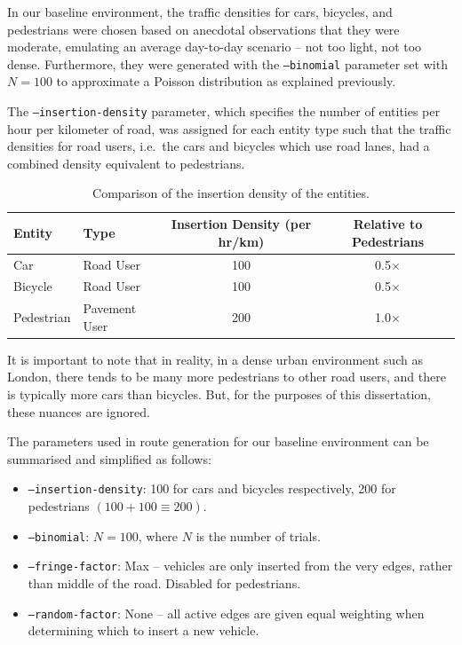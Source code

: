 \documentclass[a4paper]{report}
\begin{document}
In our baseline environment, the traffic densities for cars, bicycles, and pedestrians were chosen based on anecdotal observations\footnotemark{} that they were moderate, emulating an average day-to-day scenario -- not too light, not too dense. Furthermore, they were generated with the \texttt{--binomial} parameter set with $N=100$ to approximate a Poisson distribution as explained previously.

The \texttt{--insertion-density} parameter, which specifies the number of entities per hour per kilometer of road, was assigned for each entity type such that the traffic densities for road users, i.e.\ the cars and bicycles which use road lanes, had a combined density equivalent to pedestrians.

\begin{table}[H]
  \centering
  \begin{tabular}{l l c c}
    \hline
    \textbf{Entity} & \textbf{Type} & \textbf{Insertion Density (per hr/km)} & \textbf{Relative to Pedestrians} \\
    \hline
    Car & Road User & 100 & 0.5$\times$ \\
    Bicycle & Road User & 100 & 0.5$\times$ \\
    Pedestrian & Pavement User & 200 & 1.0$\times$ \\
    \hline
  \end{tabular}
  \caption{Comparison of the insertion density of the entities.}
  \label{tab:insertion_density_comparison}
\end{table}

It is important to note that in reality, in a dense urban environment such as London, there tends to be many more pedestrians to other road users, and there is typically more cars than bicycles. But, for the purposes of this dissertation, these nuances are ignored.

The parameters used in route generation for our baseline environment can be summarised and simplified as follows:
\begin{itemize}
    \item \texttt{--insertion-density}: 100 for cars and bicycles respectively, 200 for pedestrians $(100+100\equiv200)$.
    \item \texttt{--binomial}: $N=100$, where $N$ is the number of trials.
    \item \texttt{--fringe-factor}: Max -- vehicles are only inserted from the very edges, rather than middle of the road. Disabled for pedestrians.
    \item \texttt{--random-factor}: None -- all active edges are given equal weighting when determining which to insert a new vehicle.
\end{itemize}
\end{document}
